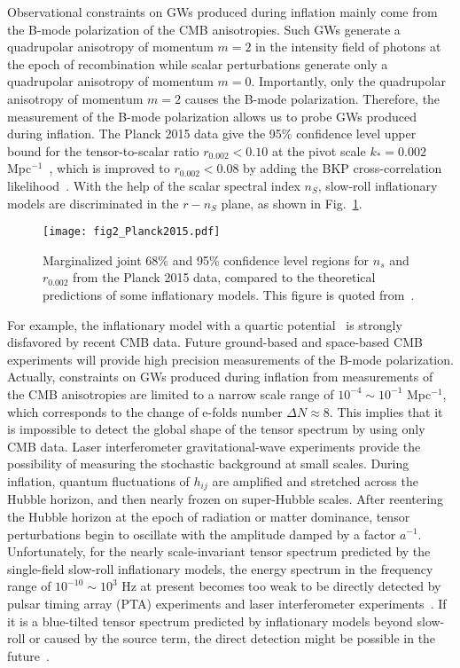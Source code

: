 \documentclass[a4paper,11pt]{article}
\begin{document}
Observational constraints on GWs produced during inflation mainly come from the B-mode polarization of the CMB anisotropies. Such GWs generate a quadrupolar anisotropy of momentum $m=2$ in the intensity field of photons at the epoch of recombination while scalar perturbations generate only a quadrupolar anisotropy of momentum $m=0$. Importantly, only the quadrupolar anisotropy of momentum $m=2$ causes the B-mode polarization. Therefore, the measurement of the B-mode polarization allows us to probe GWs produced during inflation. The Planck 2015 data give the 95\% confidence level upper bound for the tensor-to-scalar ratio $r_{0.002} < 0.10$ at the pivot scale $k_{\ast}=0.002$ Mpc$^{-1}$~\cite{Ade:2015lrj}, which is improved to $r_{0.002} < 0.08$ by adding the BKP cross-correlation likelihood~\cite{Ade:2015tva}. With the help of the scalar spectral index $n_S$, slow-roll inflationary models are discriminated in the $r-n_S$ plane, as shown in Fig.~\ref{fig:planck2015}.
\begin{figure}
  \centering
  \texttt{[image: fig2\_Planck2015.pdf]}
  \caption{Marginalized joint 68\% and 95\% confidence level regions for $n_s$ and $r_{0.002}$ from the Planck 2015 data, compared
  to the theoretical predictions of some inflationary models. This figure is quoted from~\cite{Ade:2015lrj}.}
\label{fig:planck2015}
\end{figure}
For example, the inflationary model with a quartic potential~\cite{Linde:1981mu} is strongly disfavored by recent CMB data. Future ground-based and space-based CMB experiments will provide high precision measurements of the B-mode polarization. Actually, constraints on GWs produced during inflation from measurements of the CMB anisotropies are limited to a narrow scale range of $10^{-4} \sim 10^{-1}$ Mpc$^{-1}$, which corresponds to the change of e-folds number $\Delta N \approx 8$. This implies that it is impossible to detect the global shape of the tensor spectrum by using only CMB data. Laser interferometer gravitational-wave experiments provide the possibility of measuring the stochastic background at small scales. During inflation, quantum fluctuations of $h_{ij}$ are amplified and stretched across the Hubble horizon, and then nearly frozen on super-Hubble scales. After reentering the Hubble horizon at the epoch of radiation or matter dominance, tensor perturbations begin to oscillate with the amplitude damped by a factor $a^{-1}$. Unfortunately, for the nearly scale-invariant tensor spectrum predicted by the single-field slow-roll inflationary models, the energy spectrum in the frequency range of $10^{-10} \sim 10^3$ Hz at present becomes too weak to be directly detected by pulsar timing array (PTA) experiments and laser interferometer experiments~\cite{Boyle:2005se}. If it is a blue-tilted tensor spectrum predicted by inflationary models beyond slow-roll or caused by the source term, the direct detection might be possible in the future~\cite{Bartolo:2016ami}.
\end{document}
